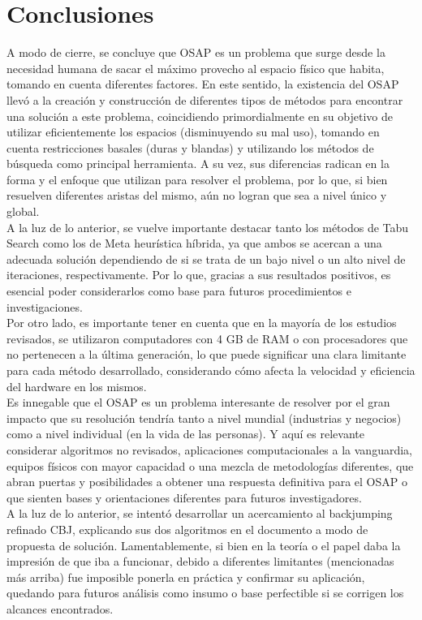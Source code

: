 \documentclass[letter, 10pt]{article}
\begin{document}
\section{Conclusiones}
A modo de cierre, se concluye que OSAP es un problema que surge desde la necesidad humana de sacar el m\'aximo provecho al espacio f\'isico que habita, tomando en cuenta diferentes factores. En este sentido, la existencia del OSAP llev\'o a la creaci\'on y construcci\'on de diferentes tipos de m\'etodos para encontrar una soluci\'on a este problema, coincidiendo primordialmente en su objetivo de utilizar eficientemente los espacios (disminuyendo su mal uso), tomando en cuenta restricciones basales (duras y blandas) y utilizando los m\'etodos de b\'usqueda como principal herramienta. A su vez, sus diferencias radican en la forma y el enfoque que utilizan para resolver el problema, por lo que, si bien resuelven diferentes aristas del mismo, a\'un no logran que sea a nivel \'unico y global. \\
A la luz de lo anterior, se vuelve importante destacar tanto los m\'etodos de Tabu Search como los de Meta heur\'istica h\'ibrida, ya que ambos se acercan a una adecuada soluci\'on dependiendo de si se trata de un bajo nivel o un alto nivel de iteraciones, respectivamente. Por lo que, gracias a sus resultados positivos, es esencial poder considerarlos como base para futuros procedimientos e investigaciones.\\
Por otro lado, es importante tener en cuenta que en la mayor\'ia de los estudios revisados, se utilizaron computadores con 4 GB de RAM o con procesadores que no pertenecen a la \'ultima generaci\'on, lo que puede significar una clara limitante para cada m\'etodo desarrollado, considerando c\'omo afecta la velocidad y eficiencia del hardware en los mismos. \\
Es innegable que el OSAP es un problema interesante de resolver por el gran impacto que su resoluci\'on tendr\'ia tanto a nivel mundial (industrias y negocios) como a nivel individual (en la vida de las personas). Y aqu\'i es relevante considerar algoritmos no revisados, aplicaciones computacionales a la vanguardia, equipos f\'isicos con mayor capacidad o una mezcla de metodolog\'ias diferentes, que abran puertas y posibilidades a obtener una respuesta definitiva para el OSAP o que sienten bases y orientaciones diferentes para futuros investigadores.\\
\noindent
A la luz de lo anterior, se intent\'o desarrollar un acercamiento al backjumping refinado CBJ, explicando sus dos algoritmos en el documento a modo de propuesta de soluci\'on. Lamentablemente, si bien en la teor\'ia o el papel daba la impresi\'on de que iba a funcionar, debido a diferentes limitantes (mencionadas m\'as arriba) fue imposible ponerla en pr\'actica y confirmar su aplicaci\'on, quedando para futuros an\'alisis como insumo o base perfectible si se corrigen los alcances encontrados.
\end{document}
